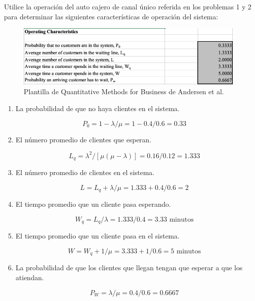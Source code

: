 \begin{problema}
	Utilice la operación del auto cajero de canal único referida en los problemas 1 y 2 para determinar las siguientes características de operación del sistema:
	\begin{figure}[H]
		\centering
		\includegraphics[scale=0.5]{Images/3}
		\caption{Plantilla de Quantitative Methods for Business de Andersen et al. }
	\end{figure}
	\begin{enumerate}
		\item La probabilidad de que no haya clientes en el sistema.
		\begin{sol}
			$$P_0=1-\lambda/\mu = 1-0.4/0.6=0.33$$
		\end{sol}
		\item El número promedio de clientes que esperan.
			\begin{sol}
			$$L_q=\lambda^2 / [\mu(\mu -\lambda)]=0.16/0.12=1.333$$
				\end{sol}
		\item El número promedio de clientes en el sistema.
			\begin{sol}
			$$L=L_q+\lambda/\mu=1.333+0.4/0.6=2$$
		\end{sol}
		\item El tiempo promedio que un cliente pasa esperando.
			\begin{sol}
			$$W_q=L_q/\lambda=1.333/0.4= 3.33 \text{ minutos}$$
		\end{sol}
		\item El tiempo promedio que un cliente pasa en el sistema.
			\begin{sol}
			$$W=W_q+1/\mu =3.333+1/0.6=5 \text{ minutos}$$
		\end{sol}
		\item La probabilidad de que los clientes que llegan tengan que esperar a que los atiendan.
			\begin{sol}
			$$P_W=\lambda/\mu = 0.4/0.6= 0.6667$$
		\end{sol}
	\end{enumerate}

\end{problema}

